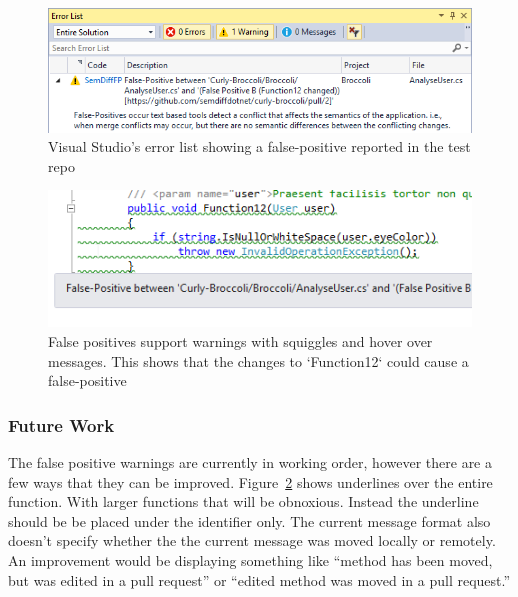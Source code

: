 \documentclass[draftclsnofoot,onecolumn]{IEEEtran}
\begin{document}
\begin{figure}[!t]
\centering
\includegraphics[width=\textwidth]{FalsePositiveErrorList}

\caption{Visual Studio’s error list showing a false-positive reported in the 
test repo}
\label{fperrorlist}
\end{figure}

\begin{figure}[!t]
\centering
\includegraphics[width=\textwidth]{FalsePositiveHoverOver}

\caption{False positives support warnings with squiggles and hover over 
messages. This shows that the changes to `Function12` could cause a 
false-positive}
\label{fphoverover}
\end{figure}

\subsubsection{Future Work}

The false positive warnings are currently in working order, however there are 
a few ways that they can be improved. Figure~\ref{fphoverover} shows 
underlines over the entire function. With larger functions that will be 
obnoxious. Instead the underline should be be placed under the identifier 
only. The current message format also doesn’t specify whether the the current 
message was moved locally or remotely. An improvement would be displaying 
something like “method has been moved, but was edited in a pull request” or 
“edited method was moved in a pull request.”
\end{document}
